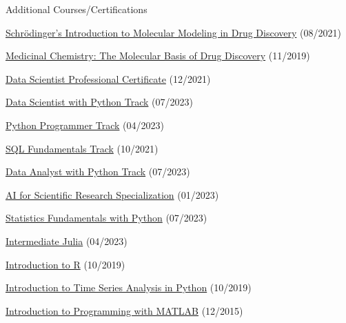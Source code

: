 \begin{cventries}
  \cventry
    {}
    {Additional Courses/Certifications}
    {}
    {}
    {
        \begin{cvitems}
            \item{\href{https://api.badgr.io/public/assertions/zZ7-bHnkTcm6H_UNr2s-LA}{Schrödinger's Introduction to Molecular Modeling in Drug Discovery} (08/2021)}           
            \item{\href{https://courses.edx.org/certificates/27307d91954041dab94af0ff554bc378}{Medicinal Chemistry: The Molecular Basis of Drug Discovery} (11/2019)}
            \item{\href{https://www.datacamp.com/certificate/DS0010628355005}{Data Scientist Professional Certificate} (12/2021)}            
            \item{\href{https://www.datacamp.com/completed/statement-of-accomplishment/track/c9974f934dc76c2b60c6933458476001728dda93}{Data Scientist with Python Track} (07/2023)}
            \item{\href{https://www.datacamp.com/statement-of-accomplishment/track/546928503f3ccea8a2ef53a6040f43997381f967}{Python Programmer Track} (04/2023)}
            \item{\href{https://www.datacamp.com/statement-of-accomplishment/track/941904e6394e2951693441d466f4643e5edfb4de}{SQL Fundamentals Track} (10/2021)}
            \item{\href{https://www.datacamp.com/completed/statement-of-accomplishment/track/4d9fb22f2514baecb5866aecd4421ba951e418a1}{Data Analyst with Python Track} (07/2023)}
            \item{\href{https://www.coursera.org/account/accomplishments/specialization/XU23J53N3SAW}{AI for Scientific Research Specialization} (01/2023)}
            \item{\href{https://www.datacamp.com/completed/statement-of-accomplishment/track/f6b840f135825806cde25b622730d804b8e9b987}{Statistics Fundamentals with Python} (07/2023)}                        
            \item{\href{https://www.datacamp.com/statement-of-accomplishment/course/930a810eaf9c88d856429bfabf33cb9df57e2046}{Intermediate Julia} (04/2023)}
            \item{\href{https://www.datacamp.com/statement-of-accomplishment/course/dd5746b9564cf374bcc0bb379e1801925e25259e}{Introduction to R} (10/2019)}
            \item{\href{https://www.datacamp.com/statement-of-accomplishment/course/807548ea866063da3c0083afcebf3be48d44f277}{Introduction to Time Series Analysis in Python} (10/2019)}
            \item {\href{https://www.coursera.org/account/accomplishments/verify/9G7V69L6QP}{Introduction to Programming with MATLAB} (12/2015)}
        \end{cvitems}      
    }

\end{cventries}
